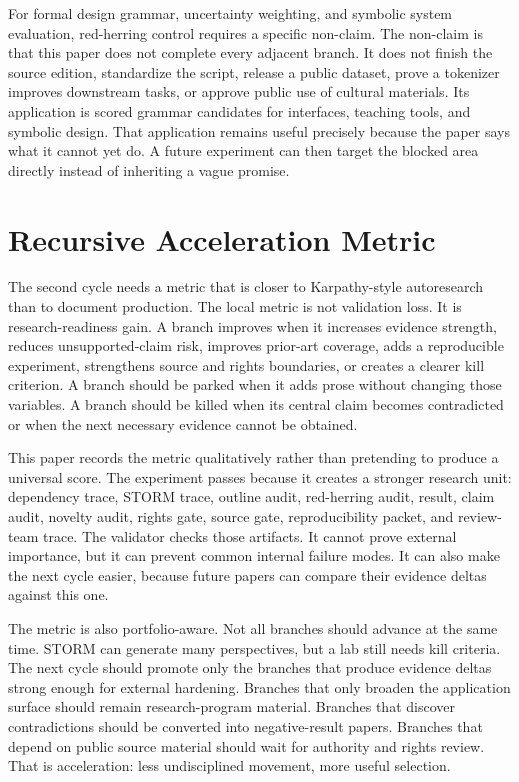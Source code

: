 \documentclass[sigconf,nonacm]{acmart}
\begin{document}
For formal design grammar, uncertainty weighting, and symbolic system evaluation, red-herring control requires a specific non-claim. The non-claim is
that this paper does not complete every adjacent branch. It does not finish the
source edition, standardize the script, release a public dataset, prove a
tokenizer improves downstream tasks, or approve public use of cultural
materials. Its application is scored grammar candidates for interfaces, teaching tools, and symbolic design. That application remains useful
precisely because the paper says what it cannot yet do. A future experiment can
then target the blocked area directly instead of inheriting a vague promise.

\section{Recursive Acceleration Metric}
The second cycle needs a metric that is closer to Karpathy-style autoresearch
than to document production. The local metric is not validation loss. It is
research-readiness gain. A branch improves when it increases evidence strength,
reduces unsupported-claim risk, improves prior-art coverage, adds a reproducible
experiment, strengthens source and rights boundaries, or creates a clearer kill
criterion. A branch should be parked when it adds prose without changing those
variables. A branch should be killed when its central claim becomes contradicted
or when the next necessary evidence cannot be obtained.

This paper records the metric qualitatively rather than pretending to produce a
universal score. The experiment passes because it creates a stronger research
unit: dependency trace, STORM trace, outline audit, red-herring audit, result,
claim audit, novelty audit, rights gate, source gate, reproducibility packet,
and review-team trace. The validator checks those artifacts. It cannot prove
external importance, but it can prevent common internal failure modes. It can
also make the next cycle easier, because future papers can compare their
evidence deltas against this one.

The metric is also portfolio-aware. Not all branches should advance at the same
time. STORM can generate many perspectives, but a lab still needs kill criteria.
The next cycle should promote only the branches that produce evidence deltas
strong enough for external hardening. Branches that only broaden the application
surface should remain research-program material. Branches that discover
contradictions should be converted into negative-result papers. Branches that
depend on public source material should wait for authority and rights review.
That is acceleration: less undisciplined movement, more useful selection.
\end{document}
